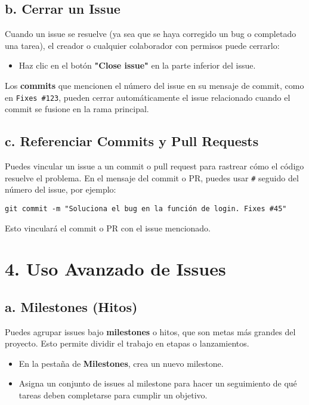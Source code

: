 \documentclass{article}
\begin{document}
\subsection{b. Cerrar un Issue}
Cuando un issue se resuelve (ya sea que se haya corregido un bug o completado una tarea), el creador o cualquier colaborador con permisos puede cerrarlo:
\begin{itemize}
    \item Haz clic en el botón \textbf{"Close issue"} en la parte inferior del issue.
\end{itemize}
Los \textbf{commits} que mencionen el número del issue en su mensaje de commit, como en \texttt{Fixes \#123}, pueden cerrar automáticamente el issue relacionado cuando el commit se fusione en la rama principal.

\subsection{c. Referenciar Commits y Pull Requests}
Puedes vincular un issue a un commit o pull request para rastrear cómo el código resuelve el problema. En el mensaje del commit o PR, puedes usar \texttt{\#} seguido del número del issue, por ejemplo:
\begin{verbatim}
git commit -m "Soluciona el bug en la función de login. Fixes #45"
\end{verbatim}
Esto vinculará el commit o PR con el issue mencionado.

\section{4. Uso Avanzado de Issues}
\subsection{a. Milestones (Hitos)}
Puedes agrupar issues bajo \textbf{milestones} o hitos, que son metas más grandes del proyecto. Esto permite dividir el trabajo en etapas o lanzamientos.
\begin{itemize}
    \item En la pestaña de \textbf{Milestones}, crea un nuevo milestone.
    \item Asigna un conjunto de issues al milestone para hacer un seguimiento de qué tareas deben completarse para cumplir un objetivo.
\end{itemize}
\end{document}
